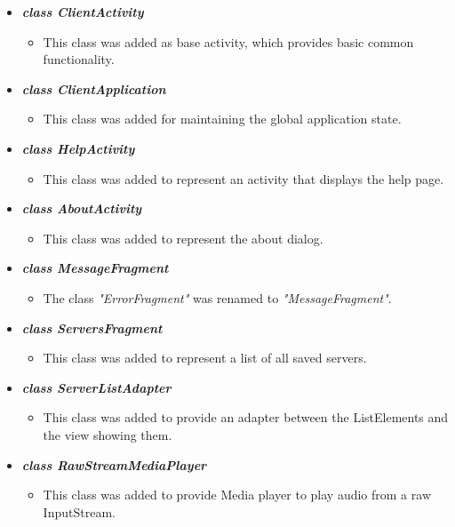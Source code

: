 \documentclass[a4paper,10pt]{scrartcl}
\begin{document}
\begin{itemize}
 \item \textit{\textbf{class ClientActivity}}
	\begin{itemize}
	 \item This class was added as base activity, which provides basic common functionality.
	\end{itemize}
	 
    \item \textbf{\textit{class ClientApplication}}
	\begin{itemize}
	 \item This class was added for maintaining the global application state.
	\end{itemize}
	
	\item \textbf{\textit{class HelpActivity}}
	\begin{itemize}
	 \item This class was added to represent an activity that displays the help page.
	\end{itemize}
	
	\item \textbf{\textit{class AboutActivity}}
	\begin{itemize}
	 \item This class was added to represent the about dialog.
	\end{itemize}
	
   \item \textbf{\textit{class MessageFragment}}
  \begin{itemize}
	 \item The class \textit{"ErrorFragment"} was renamed to \textit{"MessageFragment"}.
	\end{itemize}
	
	\item \textbf{\textit{class ServersFragment}}
	\begin{itemize}
	 \item This class was added to represent a list of all saved servers.
	\end{itemize}
	
	\item \textbf{\textit{class ServerListAdapter}}
	\begin{itemize}
	\item This class was added to provide an adapter between the ListElements and the view showing them.
	\end{itemize}
	
	\item \textbf{\textit{class RawStreamMediaPlayer}}
	\begin{itemize}
  \item This class was added to provide Media player to play audio from a raw InputStream.
	\end{itemize}
	

\end{itemize}
\end{document}
